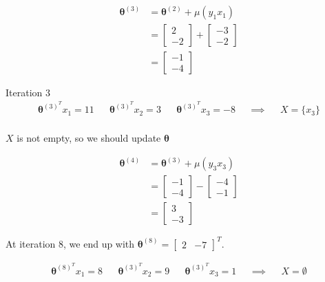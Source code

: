\documentclass[a4paper, 10pt, twoside]{article}
\begin{document}
\begin{enumerate}[a)]
          \begin{align*}
              \bm{\theta}^{(3)} & = \bm{\theta}^{(2)} + \mu (y_1 x_1)                       \\
                                & = \begin{bmatrix} 2 \\ -2 \end{bmatrix} + \begin{bmatrix} -3 \\ -2 \end{bmatrix} \\
                                & = \begin{bmatrix} -1 \\ -4 \end{bmatrix}
          \end{align*}

          Iteration 3
          \begin{align*}
              \bm{\theta}^{(3)^T} x_1 = 11 &  & \bm{\theta}^{(3)^T} x_2 = 3 &  & \bm{\theta}^{(3)^T} x_3 = -8 &  & \implies &  & X = \{ x_3 \} \\
          \end{align*}

          $X$ is not empty, so we should update $\bm{\theta}$

          \begin{align*}
              \bm{\theta}^{(4)} & = \bm{\theta}^{(3)} + \mu (y_3 x_3)                       \\
                                & = \begin{bmatrix} -1 \\ -4 \end{bmatrix} - \begin{bmatrix} -4 \\ -1 \end{bmatrix} \\
                                & = \begin{bmatrix} 3 \\ -3 \end{bmatrix}
          \end{align*}

          At iteration 8, we end up with $\bm{\theta}^{(8)} = \begin{bmatrix} 2 & -7 \end{bmatrix}^T $.

          \begin{align*}
              \bm{\theta}^{(8)^T} x_1 = 8 &  & \bm{\theta}^{(3)^T} x_2 = 9 &  & \bm{\theta}^{(3)^T} x_3 = 1 &  & \implies &  & X = \emptyset \\
          \end{align*}


\end{enumerate}
\end{document}
